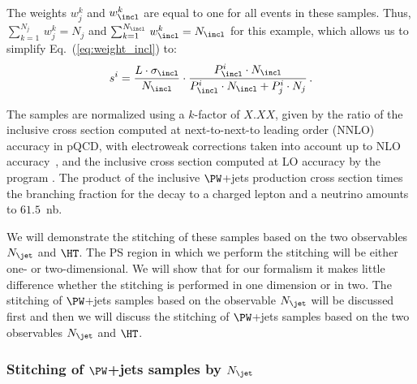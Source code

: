 The weights $w_{j}^{k}$ and $w_{\incl}^{k}$ are equal to one for all events in these samples.
Thus, $\sum_{k=1}^{N_{j}} \, w_{j}^{k} = N_{j}$ and $\sum_{k=1}^{N_{\incl}} \, w_{\incl}^{k} = N_{\incl}$ for this example,
which allows us to simplify Eq.~(\ref{eq:weight_incl}) to:
\begin{equation}
s^{i} = \frac{L \cdot \sigma_{\incl}}{N_{\incl}} \cdot \frac{P_{\incl}^{i} \cdot N_{\incl}}{P_{\incl}^{i} \cdot N_{\incl} + P_{j}^{i} \cdot N_{j}} \, .
\label{eq:weight_incl_simplified}
\end{equation}

The samples are normalized using a $k$-factor of $X.XX$, given by the ratio of the inclusive cross section computed at next-to-next-to leading order (NNLO) accuracy in pQCD,
with electroweak corrections taken into account up to NLO accuracy~\cite{Li:2012wna},
and the inclusive cross section computed at LO accuracy by the program \MGvATNLO.
The product of the inclusive $\PW$+jets production cross section times the branching fraction for the decay to a charged lepton and a neutrino amounts to $61.5$~nb.

We will demonstrate the stitching of these samples based on the two observables $N_{\jet}$ and $\HT$.
The PS region in which we perform the stitching will be either one- or two-dimensional.
We will show that for our formalism
it makes little difference whether the stitching is performed in one dimension or in two.
The stitching of $\PW$+jets samples based on the observable $N_{\jet}$ will be discussed first
and then we will discuss the stitching of $\PW$+jets samples based on the two observables $N_{\jet}$ and $\HT$.


\subsubsection{Stitching of \texorpdfstring{$\PW$}{W}+jets samples by \texorpdfstring{$N_{\jet}$}{Njet}}
\label{sec:WJets_vs_Njet}

